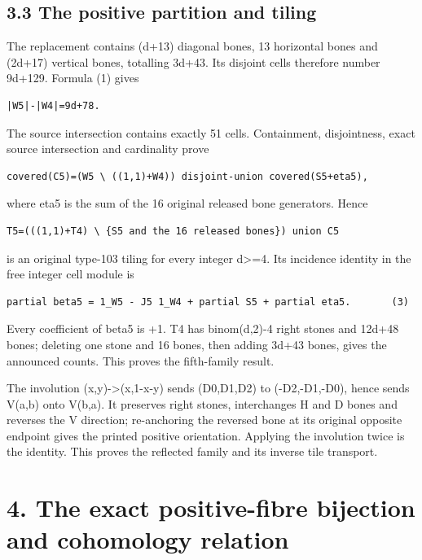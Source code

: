 \documentclass[
  10pt,
]{scrreprt}
\begin{document}
\subsection{3.3 The positive partition and
tiling}\label{edition-7-section-9}

The replacement contains (d+13) diagonal bones, 13 horizontal bones and
(2d+17) vertical bones, totalling 3d+43. Its disjoint cells therefore
number 9d+129. Formula (1) gives

\begin{verbatim}
|W5|-|W4|=9d+78.
\end{verbatim}

The source intersection contains exactly 51 cells. Containment,
disjointness, exact source intersection and cardinality prove

\begin{verbatim}
covered(C5)=(W5 \ ((1,1)+W4)) disjoint-union covered(S5+eta5),
\end{verbatim}

where eta5 is the sum of the 16 original released bone generators. Hence

\begin{verbatim}
T5=(((1,1)+T4) \ {S5 and the 16 released bones}) union C5
\end{verbatim}

is an original type-103 tiling for every integer d\textgreater=4. Its
incidence identity in the free integer cell module is

\begin{verbatim}
partial beta5 = 1_W5 - J5 1_W4 + partial S5 + partial eta5.       (3)
\end{verbatim}

Every coefficient of beta5 is +1. T4 has binom(d,2)-4 right stones and
12d+48 bones; deleting one stone and 16 bones, then adding 3d+43 bones,
gives the announced counts. This proves the fifth-family result.

The involution (x,y)-\textgreater(x,1-x-y) sends (D0,D1,D2) to
(-D2,-D1,-D0), hence sends V(a,b) onto V(b,a). It preserves right
stones, interchanges H and D bones and reverses the V direction;
re-anchoring the reversed bone at its original opposite endpoint gives
the printed positive orientation. Applying the involution twice is the
identity. This proves the reflected family and its inverse tile
transport.

\section{4. The exact positive-fibre bijection and cohomology
relation}\label{edition-7-section-10}
\end{document}
